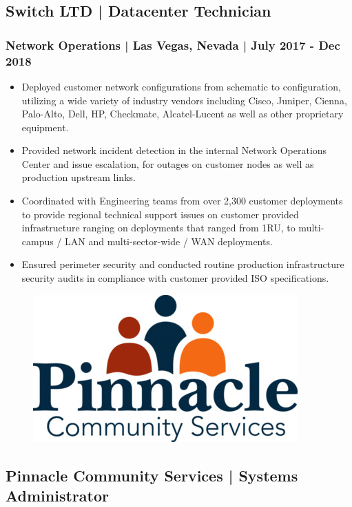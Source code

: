 \documentclass[letter,10pt]{article}
\begin{document}
\subsection*{Switch LTD | Datacenter Technician}
\label{sec:orga2113b0}
\subsubsection*{Network Operations | Las Vegas, Nevada | July 2017 - Dec 2018}
\label{sec:orgd9d8076}
\begin{itemize}
\item Deployed customer network configurations from schematic to configuration, utilizing a wide variety of industry vendors including Cisco, Juniper, Cienna, Palo-Alto, Dell, HP, Checkmate, Alcatel-Lucent as well as other proprietary equipment.
\item Provided network incident detection in the internal Network Operations Center and issue escalation, for outages on customer nodes as well as production upstream links.
\item Coordinated with Engineering teams from over 2,300 customer deployments to provide regional technical support issues on customer provided infrastructure ranging on deployments that ranged from 1RU, to multi-campus / LAN and multi-sector-wide / WAN deployments.
\item Ensured perimeter security and conducted routine production infrastructure security audits in compliance with customer provided ISO specifications.
\end{itemize}




\begin{figure}
\includegraphics[width=0.8\linewidth]{./img/50p_cr_pinnacle.jpg}
\end{figure}

\subsection*{Pinnacle Community Services | Systems Administrator}
\label{sec:org859898c}
\end{document}
